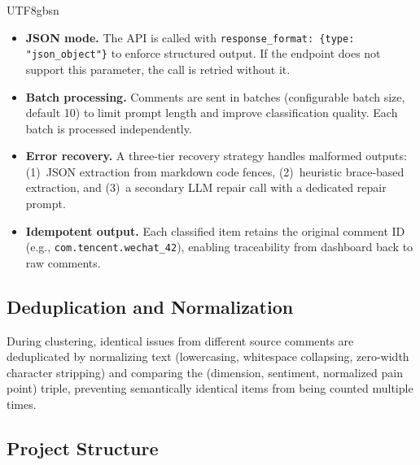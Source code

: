 \documentclass[11pt,a4paper]{article}
\begin{document}
\begin{CJK*}{UTF8}{gbsn}
\begin{itemize}[nosep]
  \item \textbf{JSON mode.} The API is called with \texttt{response\_format: \{type: "json\_object"\}} to enforce structured output. If the endpoint does not support this parameter, the call is retried without it.
  \item \textbf{Batch processing.} Comments are sent in batches (configurable batch size, default 10) to limit prompt length and improve classification quality. Each batch is processed independently.
  \item \textbf{Error recovery.} A three-tier recovery strategy handles malformed outputs: (1)~JSON extraction from markdown code fences, (2)~heuristic brace-based extraction, and (3)~a secondary LLM repair call with a dedicated repair prompt.
  \item \textbf{Idempotent output.} Each classified item retains the original comment ID (e.g., \texttt{com.tencent.wechat\_42}), enabling traceability from dashboard back to raw comments.
\end{itemize}

\subsection{Deduplication and Normalization}

During clustering, identical issues from different source comments are deduplicated by normalizing text (lowercasing, whitespace collapsing, zero-width character stripping) and comparing the (dimension, sentiment, normalized pain point) triple, preventing semantically identical items from being counted multiple times.

\subsection{Project Structure}


\end{CJK*}
\end{document}

